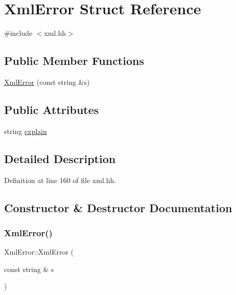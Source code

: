 \hypertarget{struct_xml_error}{}\section{Xml\+Error Struct Reference}
\label{struct_xml_error}


{\ttfamily \#include $<$xml.\+hh$>$}

\subsection*{Public Member Functions}
\begin{DoxyCompactItemize}
\item 
\mbox{\hyperlink{struct_xml_error_a9bedbcd164b20da5a108eb37419134fa}{Xml\+Error}} (const string \&s)
\end{DoxyCompactItemize}
\subsection*{Public Attributes}
\begin{DoxyCompactItemize}
\item 
string \mbox{\hyperlink{struct_xml_error_aa151d34ce48f4ac6ee225f2491758f9a}{explain}}
\end{DoxyCompactItemize}


\subsection{Detailed Description}


Definition at line 160 of file xml.\+hh.



\subsection{Constructor \& Destructor Documentation}
\mbox{\label{struct_xml_error_a9bedbcd164b20da5a108eb37419134fa}} 
\subsubsection{\texorpdfstring{XmlError()}{XmlError()}}
{\footnotesize\ttfamily Xml\+Error\+::\+Xml\+Error (\begin{DoxyParamCaption}\item[{const string \&}]{s }\end{DoxyParamCaption})\hspace{0.3cm}{\ttfamily [inline]}}



